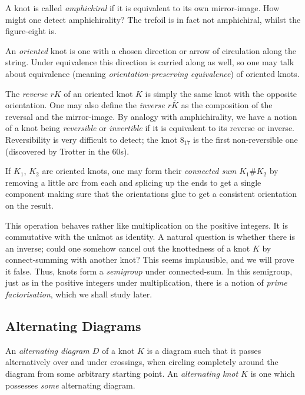 \begin{definition}
  A knot is called \emph{amphichiral} if it is equivalent to its own
  mirror-image. How might one detect amphichirality? The trefoil is in fact
  not amphichiral, whilst the figure-eight is.
\end{definition}

\begin{definition}
  An \emph{oriented} knot is one with a chosen direction or arrow of
  circulation along the string. Under equivalence this direction is carried
  along as well, so one may talk about equivalence (meaning
  \emph{orientation-preserving equivalence}) of oriented knots.
\end{definition}

\begin{definition}
  The \emph{reverse $rK$} of an oriented knot $K$ is simply the same knot
  with the opposite orientation. One may also define the \emph{inverse
    $r\bar K$} as the composition of the reversal and the mirror-image. By
  analogy with amphichirality, we have a notion of a knot being
  \emph{reversible} or \emph{invertible} if it is equivalent to its reverse
  or inverse. Reversibility is very difficult to detect; the knot $8_{17}$
  is the first non-reversible one (discovered by Trotter in the 60s).
\end{definition}

\begin{definition}
  If $K_1$, $K_2$ are oriented knots, one may form their \emph{connected
    sum $K_1\# K_2$} by removing a little arc from each and splicing up the
  ends to get a single component making sure that the orientations glue to
  get a consistent orientation on the result.
\end{definition}

This operation behaves rather like multiplication on the positive
integers. It is commutative with the unknot as identity. A natural question
is whether there is an inverse; could one somehow cancel out the
knottedness of a knot $K$ by connect-summing with another knot? This seems
implausible, and we will prove it false. Thus, knots form a
\emph{semigroup} under connected-sum. In this semigroup, just as in the
positive integers under multiplication, there is a notion of \emph{prime
  factorisation}, which we shall study later.

\subsection{Alternating Diagrams}
\begin{definition}
  An \emph{alternating diagram $D$} of a knot $K$ is a diagram such that it
  passes alternatively over and under crossings, when circling completely
  around the diagram from some arbitrary starting point. An
  \emph{alternating knot $K$} is one which possesses \emph{some}
  alternating diagram.
\end{definition}

